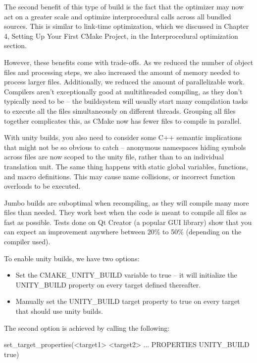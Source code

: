 The second benefit of this type of build is the fact that the optimizer may now act on a greater scale and optimize interprocedural calls across all bundled sources. This is similar to link-time optimization, which we discussed in Chapter 4, Setting Up Your First CMake Project, in the Interprocedural optimization section.

However, these benefits come with trade-offs. As we reduced the number of object files and processing steps, we also increased the amount of memory needed to process larger files. Additionally, we reduced the amount of parallelizable work. Compilers aren’t exceptionally good at multithreaded compiling, as they don’t typically need to be – the buildsystem will usually start many compilation tasks to execute all the files simultaneously on different threads. Grouping all files together complicates this, as CMake now has fewer files to compile in parallel.

With unity builds, you also need to consider some C++ semantic implications that might not be so obvious to catch – anonymous namespaces hiding symbols across files are now scoped to the unity file, rather than to an individual translation unit. The same thing happens with static global variables, functions, and macro definitions. This may cause name collisions, or incorrect function overloads to be executed.

Jumbo builds are suboptimal when recompiling, as they will compile many more files than needed. They work best when the code is meant to compile all files as fast as possible. Tests done on Qt Creator (a popular GUI library) show that you can expect an improvement anywhere between 20\% to 50\% (depending on the compiler used).

To enable unity builds, we have two options:

\begin{itemize}
\item
Set the CMAKE\_UNITY\_BUILD variable to true – it will initialize the UNITY\_BUILD property on every target defined thereafter.

\item
Manually set the UNITY\_BUILD target property to true on every target that should use unity builds.
\end{itemize}

The second option is achieved by calling the following:

\begin{shell}
set_target_properties(<target1> <target2> ...
                      PROPERTIES UNITY_BUILD true)
\end{shell}

